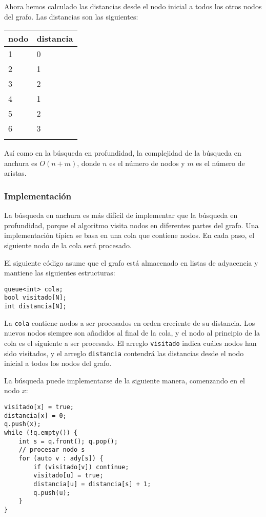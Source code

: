 Ahora hemos calculado las distancias desde el nodo inicial
a todos los otros nodos del grafo. Las distancias son
las siguientes:

\begin{center}
    \begin{tabular}{ll}
        \\
        nodo & distancia \\
        \hline
        1    & 0         \\
        2    & 1         \\
        3    & 2         \\
        4    & 1         \\
        5    & 2         \\
        6    & 3         \\
        \\
    \end{tabular}
\end{center}

Así como en la búsqueda en profundidad, la complejidad
de la búsqueda en anchura es $O(n+m)$, donde $n$ es el
número de nodos y $m$ es el número de aristas.

\subsubsection*{Implementación}

La búsqueda en anchura es más difícil de implementar que
la búsqueda en profundidad, porque el algoritmo visita nodos
en diferentes partes del grafo. Una implementación típica se
basa en una cola que contiene nodos. En cada paso, el siguiente
nodo de la cola será procesado.

El siguiente código asume que el grafo está almacenado
en listas de adyacencia y mantiene las siguientes estructuras:
\begin{lstlisting}
queue<int> cola;
bool visitado[N];
int distancia[N];
\end{lstlisting}

La \texttt{cola} contiene nodos a ser procesados en orden
creciente de su distancia. Los nuevos nodos siempre son añadidos al
final de la cola, y el nodo al principio de la cola es el siguiente
a ser procesado. El arreglo \texttt{visitado} indica cuáles nodos han
sido visitados, y el arreglo \texttt{distancia} contendrá las distancias
desde el nodo inicial a todos los nodos del grafo.

La búsqueda puede implementarse de la siguiente manera,
comenzando en el nodo $x$:
\begin{lstlisting}
visitado[x] = true;
distancia[x] = 0;
q.push(x);
while (!q.empty()) {
    int s = q.front(); q.pop();
    // procesar nodo s
    for (auto v : ady[s]) {
        if (visitado[v]) continue;
        visitado[u] = true;
        distancia[u] = distancia[s] + 1;
        q.push(u);
    }
}
\end{lstlisting}

